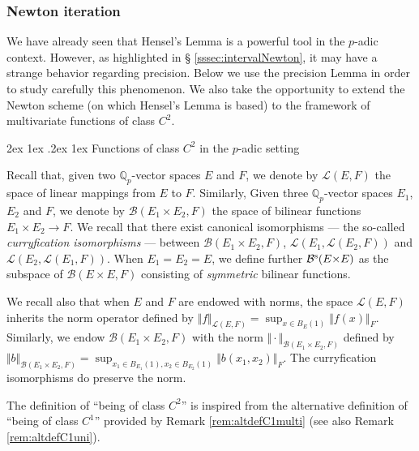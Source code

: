 \documentclass[11pt]{article}
\makeatletter
\numberwithin{equation}{section}
\numberwithin{figure}{section}
\renewcommand\paragraph{\@startsection{paragraph}{4}{\z@}%
                                    {2ex \@plus1ex \@minus.2ex}%
                                    {1ex}%
                                    {\normalfont\normalsize\bfseries}}
\theoremstyle{definition}
\newcommand{\Q}{\mathbb Q}
\newcommand{\Qp}{\Q_p}
\newcommand{\calB}{\mathcal B}
\newcommand{\calL}{\mathcal L}
\newcommand{\symm}{\text{\rm s}}
\makeatother
\begin{document}
\subsubsection{Newton iteration}
\label{sssec:NewtonC2}

We have already seen that Hensel's Lemma is a powerful tool in the 
$p$-adic context. However, as highlighted in \S 
\ref{sssec:intervalNewton}, it may have a strange behavior regarding 
precision. Below we use the precision Lemma in order to study carefully 
this phenomenon. We also take the opportunity to extend the Newton 
scheme (on which Hensel's Lemma is based) to the framework of 
multivariate functions of class $C^2$.

\paragraph{Functions of class $C^2$ in the $p$-adic setting}

Recall that, given two $\Qp$-vector spaces $E$ and $F$, we denote by
$\calL(E,F)$ the space of linear mappings from $E$ to $F$. Similarly,
Given three $\Qp$-vector spaces $E_1$, $E_2$ and $F$, we denote by 
$\calB(E_1{\times}E_2, F)$ the space of bilinear functions 
$E_1{\times}E_2 \to F$. We recall that there exist canonical 
isomorphisms --- the so-called \emph{curryfication isomorphisms} --- 
between $\calB(E_1{\times}E_2, F)$, $\calL(E_1, \calL(E_2,F))$ and 
$\calL(E_2, \calL(E_1,F))$. When $E_1 = E_2 = E$, we define further 
$\calB^\symm(E{\times}E)$ as the subspace of $\calB(E{\times}E, F)$ 
consisting of \emph{symmetric} bilinear functions.

We recall also that when $E$ and $F$ are endowed with norms, the
space $\calL(E,F)$ inherits the norm operator defined by 
$\Vert f \Vert_{\calL(E,F)} = \sup_{x \in B_E(1)} \Vert f(x) \Vert_F$.
Similarly, we endow $\calB(E_1{\times}E_2,F)$ with the norm
$\Vert \cdot \Vert_{\calB(E_1{\times}E_2,F)}$ defined by
$\Vert b \Vert_{\calB(E_1{\times}E_2,F)} = \sup_{x_1 \in B_{E_1}(1), 
x_2 \in B_{E_2}(1)} \Vert b(x_1,x_2) \Vert_F$. The curryfication
isomorphisms do preserve the norm.

The definition of ``being of class $C^2$'' is inspired from the 
alternative definition of ``being of class $C^1$'' provided by Remark 
\ref{rem:altdefC1multi} (see also Remark \ref{rem:altdefC1uni}).
\end{document}
